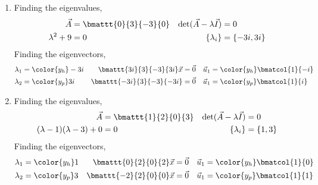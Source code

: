 \begin{enumerate}
    \item Finding the eigenvalues,
          \begin{align}
              \vec{A}                        & = \bmattt{0}{3}{-3}{0} &
              \det(\vec{A} - \lambda\vec{I}) & = 0                      \\
              \lambda^2 + 9                  & = 0                    &
              \{\lambda_i\}                  & = \{-3i, 3i\}
          \end{align}
          Finding the eigenvectors,
          \begin{align}
              \lambda_1                      & = \color{y_h} -3i &
              \bmattt{3i}{3}{-3}{3i} \vec{x} & = \vec{0}         &
              \vec{u}_1                      & = \color{y_h}
              \bmatcol{1}{-i}                                      \\
              \lambda_2                      & = \color{y_p} 3i  &
              \bmattt{-3i}{3}{-3}{-3i}       & = \vec{0}         &
              \vec{u}_1                      & = \color{y_p}
              \bmatcol{1}{i}
          \end{align}

    \item Finding the eigenvalues,
          \begin{align}
              \vec{A}                        & = \bmattt{1}{2}{0}{3} &
              \det(\vec{A} - \lambda\vec{I}) & = 0                     \\
              (\lambda - 1)(\lambda - 3) + 0 & = 0                   &
              \{\lambda_i\}                  & = \{1, 3\}
          \end{align}
          Finding the eigenvectors,
          \begin{align}
              \lambda_1                    & = \color{y_h} 1 &
              \bmattt{0}{2}{0}{2} \vec{x}  & = \vec{0}       &
              \vec{u}_1                    & = \color{y_h}
              \bmatcol{1}{0}                                   \\
              \lambda_2                    & = \color{y_p} 3 &
              \bmattt{-2}{2}{0}{0} \vec{x} & = \vec{0}       &
              \vec{u}_1                    & = \color{y_p}
              \bmatcol{1}{1}
          \end{align}


\end{enumerate}
